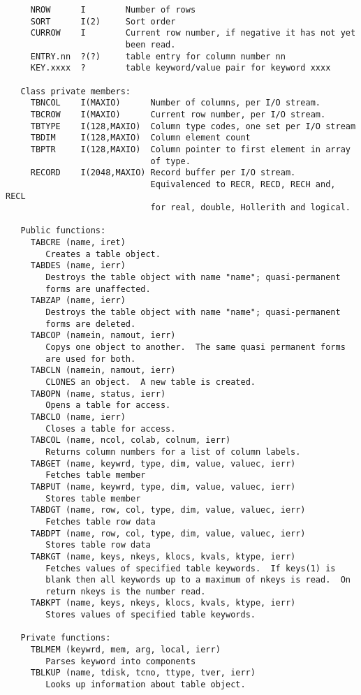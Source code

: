 {\small\begin{verbatim}
     NROW      I        Number of rows
     SORT      I(2)     Sort order
     CURROW    I        Current row number, if negative it has not yet
                        been read.
     ENTRY.nn  ?(?)     table entry for column number nn
     KEY.xxxx  ?        table keyword/value pair for keyword xxxx

   Class private members:
     TBNCOL    I(MAXIO)      Number of columns, per I/O stream.
     TBCROW    I(MAXIO)      Current row number, per I/O stream.
     TBTYPE    I(128,MAXIO)  Column type codes, one set per I/O stream
     TBDIM     I(128,MAXIO)  Column element count
     TBPTR     I(128,MAXIO)  Column pointer to first element in array
                             of type.
     RECORD    I(2048,MAXIO) Record buffer per I/O stream.
                             Equivalenced to RECR, RECD, RECH and, RECL
                             for real, double, Hollerith and logical.

   Public functions:
     TABCRE (name, iret)
        Creates a table object.
     TABDES (name, ierr)
        Destroys the table object with name "name"; quasi-permanent
        forms are unaffected.
     TABZAP (name, ierr)
        Destroys the table object with name "name"; quasi-permanent
        forms are deleted.
     TABCOP (namein, namout, ierr)
        Copys one object to another.  The same quasi permanent forms
        are used for both.
     TABCLN (namein, namout, ierr)
        CLONES an object.  A new table is created.
     TABOPN (name, status, ierr)
        Opens a table for access.
     TABCLO (name, ierr)
        Closes a table for access.
     TABCOL (name, ncol, colab, colnum, ierr)
        Returns column numbers for a list of column labels.
     TABGET (name, keywrd, type, dim, value, valuec, ierr)
        Fetches table member
     TABPUT (name, keywrd, type, dim, value, valuec, ierr)
        Stores table member
     TABDGT (name, row, col, type, dim, value, valuec, ierr)
        Fetches table row data
     TABDPT (name, row, col, type, dim, value, valuec, ierr)
        Stores table row data
     TABKGT (name, keys, nkeys, klocs, kvals, ktype, ierr)
        Fetches values of specified table keywords.  If keys(1) is
        blank then all keywords up to a maximum of nkeys is read.  On
        return nkeys is the number read.
     TABKPT (name, keys, nkeys, klocs, kvals, ktype, ierr)
        Stores values of specified table keywords.

   Private functions:
     TBLMEM (keywrd, mem, arg, local, ierr)
        Parses keyword into components
     TBLKUP (name, tdisk, tcno, ttype, tver, ierr)
        Looks up information about table object.
\end{verbatim}}


